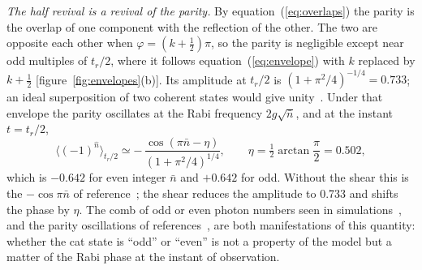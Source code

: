 \documentclass{iopjournal}
\newcommand{\nbar}{\bar{n}}
\begin{document}
\textit{The half revival is a revival of the parity.} By equation~(\ref{eq:overlaps}) the parity is the overlap of one component with the reflection of the other. The two are opposite each other when $\varphi = (k+\tfrac12)\pi$, so the parity is negligible except near odd multiples of $t_r/2$, where it follows equation~(\ref{eq:envelope}) with $k$ replaced by $k+\tfrac{1}{2}$ [figure~\ref{fig:envelopes}(b)]. Its amplitude at $t_r/2$ is $(1+\pi^2/4)^{-1/4} = 0.733$; an ideal superposition of two coherent states would give unity~\cite{assemat2019}. Under that envelope the parity oscillates at the Rabi frequency $2g\sqrt{\nbar}$, and at the instant $t = t_r/2$,
\begin{equation}
\langle(-1)^{\hat{n}}\rangle_{t_r/2} \simeq -\,\frac{\cos(\pi\nbar-\eta)}{(1+\pi^2/4)^{1/4}},\qquad \eta = \tfrac{1}{2}\arctan\frac{\pi}{2} = 0.502,
\label{eq:parity}
\end{equation}
which is $-0.642$ for even integer $\nbar$ and $+0.642$ for odd. Without the shear this is the $-\cos\pi\nbar$ of reference~\cite{assemat2019}; the shear reduces the amplitude to 0.733 and shifts the phase by $\eta$. The comb of odd or even photon numbers seen in simulations~\cite{buzek1992}, and the parity oscillations of references~\cite{knight2024, birrittella2015, assemat2019}, are both manifestations of this quantity: whether the cat state is ``odd'' or ``even'' is not a property of the model but a matter of the Rabi phase at the instant of observation.
\end{document}
